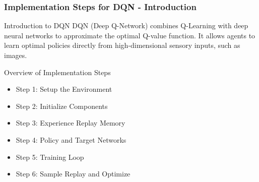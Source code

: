 \documentclass{beamer}
\begin{document}
\begin{frame}[fragile]
    \frametitle{Implementation Steps for DQN - Introduction}
    \begin{block}{Introduction to DQN}
        DQN (Deep Q-Network) combines Q-Learning with deep neural networks to approximate the optimal Q-value function. It allows agents to learn optimal policies directly from high-dimensional sensory inputs, such as images.
    \end{block}
    \begin{block}{Overview of Implementation Steps}
        \begin{itemize}
            \item Step 1: Setup the Environment
            \item Step 2: Initialize Components
            \item Step 3: Experience Replay Memory
            \item Step 4: Policy and Target Networks
            \item Step 5: Training Loop
            \item Step 6: Sample Replay and Optimize
        \end{itemize}
    \end{block}
\end{frame}
\end{document}
